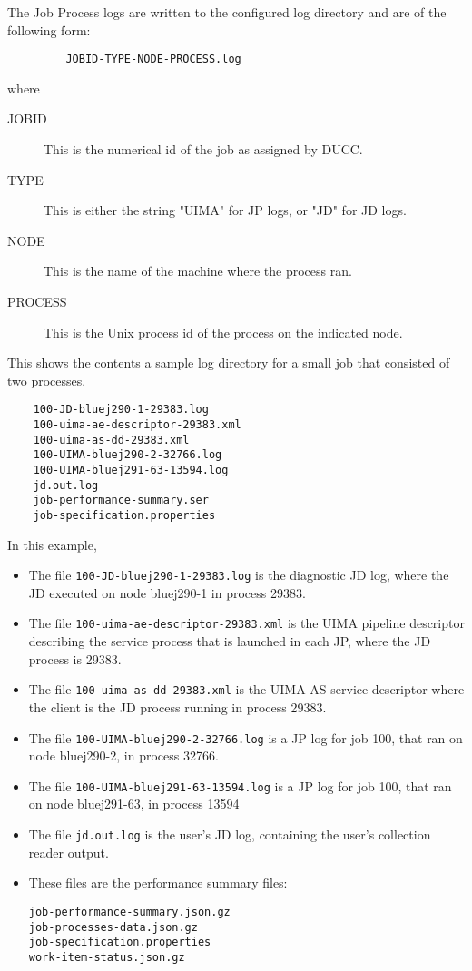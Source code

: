 The Job Process logs are written to the configured log directory and are of the following form:
\begin{verbatim}
         JOBID-TYPE-NODE-PROCESS.log 
\end{verbatim}
where 
\begin{description}
    \item[JOBID] This is the numerical id of the job as assigned by DUCC.
    \item[TYPE] This is either the string "UIMA" for JP logs, or "JD" for JD logs.
    \item[NODE] This is the name of the machine where the process ran.
    \item[PROCESS] This is the Unix process id of the process on the indicated node.
\end{description}

This shows the contents a sample log directory for a small job that consisted of two processes.

\begin{verbatim}
    100-JD-bluej290-1-29383.log 
    100-uima-ae-descriptor-29383.xml 
    100-uima-as-dd-29383.xml 
    100-UIMA-bluej290-2-32766.log 
    100-UIMA-bluej291-63-13594.log 
    jd.out.log 
    job-performance-summary.ser 
    job-specification.properties 
\end{verbatim}

In this example, 

\begin{itemize}
     \item[] The file {\tt 100-JD-bluej290-1-29383.log} is the diagnostic JD log, where the JD executed on node
       bluej290-1 in process 29383.

     \item[] The file {\tt 100-uima-ae-descriptor-29383.xml} is the UIMA pipeline descriptor describing the
       service process that is launched in each JP, where the JD process is 29383.

     \item[] The file {\tt 100-uima-as-dd-29383.xml} is the UIMA-AS service descriptor where the client is
       the JD process running in process 29383.

     \item[] The file {\tt 100-UIMA-bluej290-2-32766.log} is a JP log for job 100, that ran on node
       bluej290-2, in process 32766.

     \item[] The file {\tt 100-UIMA-bluej291-63-13594.log} is a JP log for job 100, that ran on node
       bluej291-63, in process 13594

     \item[] The file {\tt jd.out.log} is the user's JD log, containing the user's collection reader output.

       \item[] These files are the performance summary files:
\begin{verbatim}
job-performance-summary.json.gz
job-processes-data.json.gz
job-specification.properties
work-item-status.json.gz
\end{verbatim}

\end{itemize}
     
